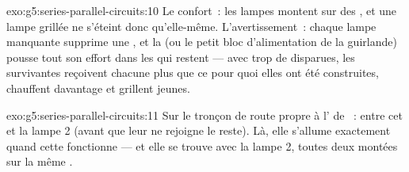 \begin{solution}{exo:g5:series-parallel-circuits:10}
Le confort~: les lampes montent sur des  , et
une lampe grillée ne s'éteint donc qu'elle-même. L'avertissement~:
chaque lampe manquante supprime une , et la  (ou le petit
bloc d'alimentation de la guirlande) pousse tout son effort dans les
 qui restent --- avec trop de  disparues, les
survivantes reçoivent chacune plus que ce pour quoi elles ont été
construites, chauffent davantage et grillent jeunes.
\end{solution}

\begin{solution}{exo:g5:series-parallel-circuits:11}
Sur le tronçon de route propre à l' de ~: entre
cet  et la lampe 2 (avant que leur  ne rejoigne le
reste). Là, elle s'allume exactement quand cette 
fonctionne --- et elle se trouve  avec la lampe 2, toutes
deux montées sur la même .
\end{solution}

